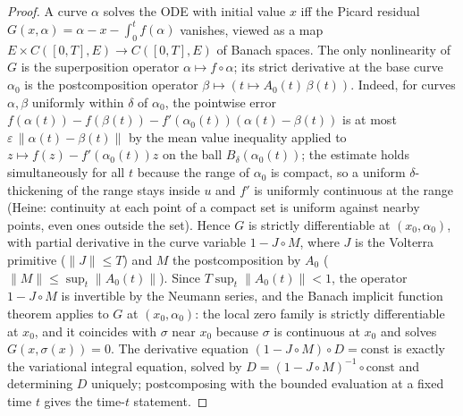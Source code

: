 \begin{proof}
  \sketch
  \leanok
  A curve $\alpha$ solves the ODE with initial value $x$ iff the Picard
  residual $G(x, \alpha) = \alpha - x - \int_0^t f(\alpha)$ vanishes, viewed as
  a map $E \times C([0,T], E) \to C([0,T], E)$ of Banach spaces. The only
  nonlinearity of $G$ is the superposition operator
  $\alpha \mapsto f \circ \alpha$; its strict derivative at the base curve
  $\alpha_0$ is the postcomposition operator
  $\beta \mapsto (t \mapsto A_0(t)\,\beta(t))$. Indeed, for curves
  $\alpha, \beta$ uniformly within $\delta$ of $\alpha_0$, the pointwise error
  $f(\alpha(t)) - f(\beta(t)) - f'(\alpha_0(t))(\alpha(t) - \beta(t))$ is at
  most $\varepsilon\,\|\alpha(t) - \beta(t)\|$ by the mean value inequality
  applied to $z \mapsto f(z) - f'(\alpha_0(t))z$ on the ball
  $B_\delta(\alpha_0(t))$; the estimate holds simultaneously for all $t$
  because the range of $\alpha_0$ is compact, so a uniform $\delta$-thickening
  of the range stays inside $u$ and $f'$ is uniformly continuous at the range
  (Heine: continuity at each point of a compact set is uniform against nearby
  points, even ones outside the set). Hence $G$ is strictly differentiable at
  $(x_0, \alpha_0)$, with partial derivative in the curve variable
  $1 - J \circ M$, where $J$ is the Volterra primitive
  ($\|J\| \le T$) and $M$ the postcomposition by $A_0$
  ($\|M\| \le \sup_t \|A_0(t)\|$). Since $T \sup_t \|A_0(t)\| < 1$, the
  operator $1 - J \circ M$ is invertible by the Neumann series, and the Banach
  implicit function theorem applies to $G$ at $(x_0, \alpha_0)$: the local zero
  family is strictly differentiable at $x_0$, and it coincides with $\sigma$
  near $x_0$ because $\sigma$ is continuous at $x_0$ and solves
  $G(x, \sigma(x)) = 0$. The derivative equation
  $(1 - J \circ M) \circ D = \mathrm{const}$ is exactly the variational
  integral equation, solved by $D = (1 - J \circ M)^{-1} \circ \mathrm{const}$
  and determining $D$ uniquely; postcomposing with the bounded evaluation at a
  fixed time $t$ gives the time-$t$ statement.
\end{proof}

